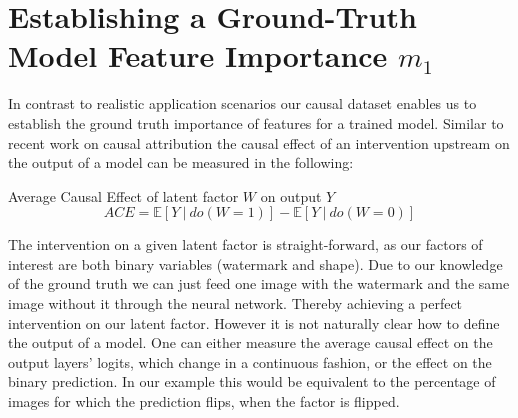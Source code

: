 \section{Establishing a Ground-Truth Model Feature Importance $m_1$}\label{section:gt_measure}
In contrast to realistic application scenarios our causal dataset enables us to establish the ground truth importance of features for a trained model. Similar to recent work on causal attribution  the causal effect of an intervention upstream on the output of a model can be measured in the following:
\begin{center}
Average Causal Effect of latent factor $W$ on output $Y$ \\
\begin{equation}
\displaystyle ACE = \mathbb{E} [ Y \ | \ do(W=1) ] - \mathbb{E} [ Y \ | \ do(W=0) ] 
\end{equation}
\end{center}
The intervention on a given latent factor is straight-forward, as our factors of interest are both binary variables (watermark and shape). Due to our knowledge of the ground truth we can just feed one image with the watermark and the same image without it through the neural network. Thereby achieving a perfect intervention on our latent factor.  
However it is not naturally clear how to define the output of a model. One can either measure the average causal effect on the output layers' logits, which change in a continuous fashion, or the effect on the binary prediction. In our example this would be equivalent to the percentage of images for which the prediction flips, when the factor is flipped. 


